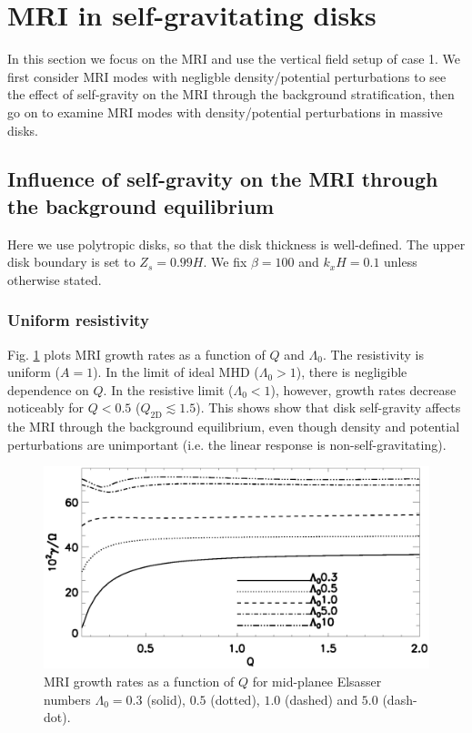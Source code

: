\section{MRI in self-gravitating disks}\label{result1}
In this section we focus on the MRI and use the vertical field setup
of case 1. We first consider MRI modes with negligble density/potential
perturbations to see the effect of self-gravity on the MRI through the
background stratification, then go on to examine MRI modes with
density/potential perturbations in massive disks.  

\subsection{Influence of self-gravity on the MRI through the
  background equilibrium}
Here we use polytropic disks, so that the disk thickness is
well-defined. The upper disk boundary is set to 
$Z_s=0.99H$. We fix $\beta=100$ and $k_xH=0.1$ unless otherwise
stated. 


\subsubsection{Uniform
  resistivity}   
Fig. \ref{compare_growth_poly_uniresis} plots MRI growth rates as a
function of $Q$ and $\Lambda_0$. The resistivity is uniform ($A=1$). 
In the limit of ideal MHD ($\Lambda_0>1$), there is negligible
dependence on $Q$. In the resistive limit 
($\Lambda_0<1$), however, growth rates decrease noticeably for $Q<0.5$
($Q_\mathrm{2D}\lesssim 1.5$). This shows 
show that disk self-gravity affects the MRI through the background
equilibrium, even though density and potential perturbations are  
unimportant (i.e. the linear response is non-self-gravitating).    
 
\begin{figure}
  \includegraphics[width=\linewidth]{figures/compare_growth_poly_uniresis2}
  \caption{MRI growth rates as a function of $Q$ for mid-planee 
    Elsasser numbers $\Lambda_0=0.3$ (solid), $0.5$ (dotted), $1.0$
    (dashed) and $5.0$ (dash-dot).  
    \label{compare_growth_poly_uniresis}}
\end{figure}


